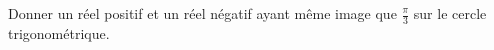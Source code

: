
\begin{exercice}\label{exosmath-0363}

    Donner un réel positif et un réel négatif ayant même image que \( \frac{ \pi }{ 3 }\) sur le cercle trigonométrique.

\end{exercice}
